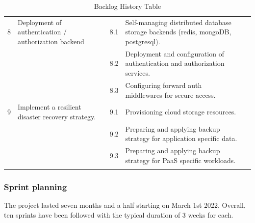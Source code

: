\begin{longtable}[H]{|m{1cm}|m{3cm}|m{1cm}|m{7cm}|m{1.2cm}|}
8 & \raggedright Deployment of authentication / authorization backend 	& 8.1 & \raggedright Self-managing distributed database storage backends (redis, mongoDB, postgresql).	 & \\
\cline{3-5}
&   & 8.2 &	\raggedright Deployment and configuration of authentication and authorization services.	 & \\
\cline{3-5}
&   & 8.3 &	\raggedright Configuring forward auth middlewares for secure access.	 & \\
   \hline
9 & \raggedright Implement a resilient disaster recovery strategy. & 9.1 &\raggedright  Provisioning cloud storage resources.		 & \\
\cline{3-5}
&   & 9.2 & \raggedright Preparing and applying backup strategy for application specific data.	 & \\
\cline{3-5}
&   & 9.3 &	\raggedright Preparing and applying backup strategy for PaaS specific workloads.	 & \\
 \hline
\caption{ Backlog History Table }
\end{longtable}


\newpage
\subsubsection{Sprint planning }
The project lasted seven months and a half starting on March 1st 2022. Overall, ten sprints have been followed with the typical duration of 3 weeks for each. 


